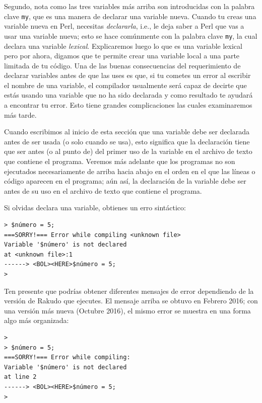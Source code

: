 Segundo, nota como las tres variables más arriba son 
introducidas con la palabra clave {\tt my}, que es una manera
de declarar una variable nueva. Cuando tu creas una variable nueva
en Perl, necesitas \emph{declararla}, i.e., le deja saber a Perl
que vas a usar una variable nueva; esto se hace comúnmente con la
palabra clave {\tt my}, la cual declara una variable \emph{lexical}.
Explicaremos luego lo que es una variable lexical pero por ahora,
digamos que te permite crear una variable local a una parte 
limitada de tu código. Una de las buenas consecuencias del requerimiento
de declarar variables antes de que las uses es que, si tu cometes
un error al escribir el nombre de una variable, el compilador 
usualmente será capaz de decirte que estás usando una variable que
no ha sido declarada y como resultado te ayudará a encontrar tu error. 
Esto tiene grandes complicaciones las cuales examinaremos más tarde.

Cuando escribimos al inicio de esta sección que una variable debe
ser declarada antes de ser usada (o solo cuando se usa), esto
significa que la declaración tiene que ser antes (o al punto de) 
del primer uso de la variable en el archivo de texto que contiene el 
programa. Veremos más adelante que los programas no son ejecutados
necesariamente de arriba hacia abajo en el orden en el que las líneas
o código aparecen en el programa; aún así, la declaración de la variable
debe ser antes de su uso en el archivo de texto que contiene el programa.

Si olvidas declara una variable, obtienes un erro sintáctico:

\begin{lstlisting}
> $número = 5;
===SORRY!=== Error while compiling <unknown file>
Variable '$número' is not declared
at <unknown file>:1
------> <BOL><HERE>$número = 5;
>
\end{lstlisting}
%
Ten presente que podrías obtener diferentes mensajes de
error dependiendo de la versión de Rakudo que ejecutes.
El mensaje arriba se obtuvo en Febrero 2016;
con una versión más nueva (Octubre 2016), el mismo error
se muestra en una forma algo más organizada:
\begin{lstlisting}
>
> $número = 5;
===SORRY!=== Error while compiling:
Variable '$número' is not declared
at line 2
------> <BOL><HERE>$número = 5;
>
\end{lstlisting}

